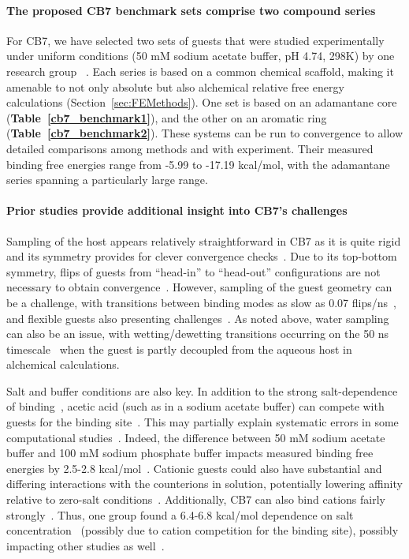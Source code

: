\documentclass[aps,pre,twocolumn,nofootinbib,superscriptaddress,10pt, final,tightenlines]{revtex4-1}
\begin{document}
\paragraph{The proposed CB7 benchmark sets comprise two compound series}
For CB7, we have selected two sets of guests that were studied experimentally under uniform conditions (50 mM sodium acetate buffer, pH 4.74, 298K) by one research group ~\cite{liu_cucurbituril_2005, cao_attomolar_2014}. Each series is based on a common chemical
scaffold, making it amenable to not only absolute but also alchemical relative free energy calculations (Section~\ref{sec:FEMethods}). One set is based on an adamantane core ({\bf Table~\ref{cb7_benchmark1}}), and the other on an aromatic ring ({\bf Table~\ref{cb7_benchmark2}}).
These systems can be run to convergence to allow detailed comparisons among methods and with experiment.
Their measured binding free energies range from -5.99 to -17.19 kcal/mol, with the adamantane series spanning a particularly large range. 


\paragraph{Prior studies provide additional insight into CB7's challenges}
Sampling of the host appears relatively straightforward in CB7 as it is quite rigid and its symmetry provides for clever convergence checks~\cite{henriksen_computational_2015, monroe_converging_2014}. 
Due to its top-bottom symmetry, flips of guests from ``head-in'' to ``head-out'' configurations are not necessary to obtain convergence~\cite{fenley_bridging_2014}.
However, sampling of the guest geometry can be a challenge, with transitions between binding modes as slow as 0.07 flips/ns~\cite{monroe_converging_2014}, and flexible guests also presenting challenges~\cite{monroe_converging_2014}. 
As noted above, water sampling can also be an issue, with wetting/dewetting transitions occurring on the 50 ns timescale~\cite{rogers_role_2013} when the guest is partly decoupled from the aqueous host in alchemical calculations.

Salt and buffer conditions are also key. 
In addition to the strong salt-dependence of binding~\cite{moghaddam_new_2011}, acetic acid (such as in a sodium acetate buffer) can compete with guests for the binding site~\cite{moghaddam_hostguest_2009}. 
This may partially explain systematic errors in some computational studies~\cite{muddana_blind_2014,hsiao_prediction_2014}. 
Indeed, the difference between 50 mM sodium acetate buffer and 100 mM sodium phosphate buffer impacts measured binding free energies by 2.5-2.8 kcal/mol~\cite{muddana_blind_2014, muddana_sampl4_2014}.  
Cationic guests could also have substantial and differing interactions with the counterions in solution, potentially lowering affinity relative to zero-salt conditions~\cite{muddana_sampl4_2014}.  
Additionally, CB7 can also bind cations fairly strongly~\cite{Isaacs:2009:Chem.Commun., cao_absolute_2014, Marquez:2004:J.Am.Chem.Soc.}.
Thus, one group found a 6.4-6.8 kcal/mol dependence on salt concentration~\cite{hsiao_prediction_2014} (possibly due to cation competition for the binding site), possibly impacting other studies as well~\cite{monroe_converging_2014}. 
\end{document}
